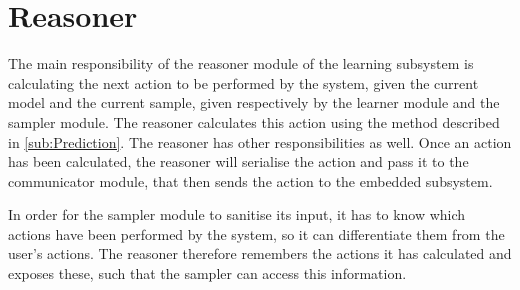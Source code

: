 \section{Reasoner}\label{sec:Reasoner}
The main responsibility of the reasoner module of the learning subsystem is calculating the next action to be performed by the system, given the current model and the current sample, given respectively by the learner module and the sampler module.
The reasoner calculates this action using the method described in \cref{sub:Prediction}.
The reasoner has other responsibilities as well. Once an action has been calculated, the reasoner will serialise the action and pass it to the communicator module, that then sends the action to the embedded subsystem.

In order for the sampler module to sanitise its input, it has to know which actions have been performed by the system, so it can differentiate them from the user's actions. The reasoner therefore remembers the actions it has calculated and exposes these, such that the sampler can access this information.

